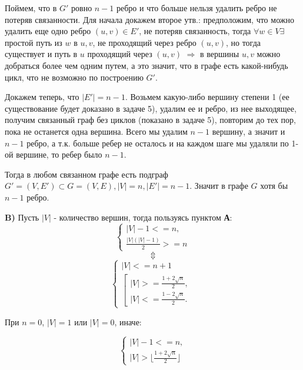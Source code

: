 \documentclass{article}
\begin{document}
 Поймем, что в $ G' $ ровно $n - 1$ ребро и что больше нельзя удалить ребро не потеряв связанности. 
 Для начала докажем второе утв.: предположим, что можно удалить еще одно ребро $(u, v) \in E'$, не потеряв связанность, тогда $ \forall w \in V \exists $ простой путь из  $w$ в $u, v$, не проходящий через ребро $(u, v)$, но тогда существует и путь в $u$ проходящий через $(u, v)$  $ \Rightarrow $ в вершины $u, v$ можно добраться более чем одним путем, а это значит, что в графе есть какой-нибудь цикл, что не возможно по построению $ G' $.
 
 Докажем теперь, что $|E'| = n - 1$.  Возьмем какую-либо вершину степени 1 (ее существование будет доказано в задаче 5), удалим ее и ребро, из нее выходящее, получим связанный граф без циклов (показано в задаче 5), повторим до тех пор, пока не останется одна вершина. Всего мы удалим $ n - 1 $ вершину, а значит и $n - 1$ ребро, а т.к. больше ребер не осталось и на каждом шаге мы удаляли по 1-ой вершине, то ребер было $ n - 1 $.  
 
 Тогда в любом связанном графе есть подграф $G'=(V, E') \subset G = (V, E), |V| = n, |E'| = n - 1$. Значит в графе $ G $ хотя бы $ n - 1$ ребро.
 
\textbf{B)} Пусть $|V|$ - количество вершин, тогда пользуясь пунктом \textbf{А}:
\begin{equation*}
	\begin{cases}
		|V| - 1 <= n, \\
		\frac{|V|(|V| - 1)}{2} >= n 
	\end{cases}
\end{equation*}
$$ \Updownarrow $$
\begin{equation*}
	\begin{cases}
		|V| <= n + 1 \\
		\left[\begin{array}{l} 
			|V| >= \frac{1 + 2\sqrt{n}}{2}, \\ 
			|V| <= \frac{1 - 2\sqrt{n}}{2}. \end{array}\right. 
	\end{cases}
\end{equation*}

При $n = 0$, $|V| = 1$ или $|V| = 0$, иначе: 

\begin{equation*}
\begin{cases}
|V| - 1 <= n, \\
|V| > \lfloor\frac{1 + 2\sqrt{n}}{2}\rfloor
\end{cases}
\end{equation*}
\end{document}
